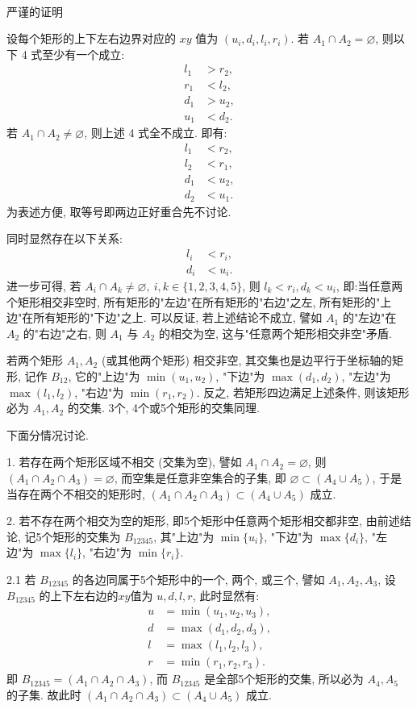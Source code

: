 ~ 

\noindent 严谨的证明

设每个矩形的上下左右边界对应的 $xy$ 值为 $(u_i, d_i, l_i, r_i)$. 若 $A_1 \cap A_2 = \varnothing$, 则以下 4 式至少有一个成立:
\begin{align*}
l_1 &> r_2, \\
r_1 &< l_2, \\
d_1 &> u_2, \\
u_1 &< d_2.
\end{align*}
若 $A_1\cap A_2 \neq \varnothing$, 则上述 4 式全不成立. 即有:
\begin{align*}
l_1 &< r_2, \\
l_2 &< r_1, \\
d_1 &< u_2, \\
d_2 &< u_1.
\end{align*}
为表述方便, 取等号即两边正好重合先不讨论.

同时显然存在以下关系:
\begin{align*}
l_i &< r_i, \\
d_i &< u_i.
\end{align*}
进一步可得, 若 $A_i\cap A_k\neq\varnothing,\ i,k\in\{1,2,3,4,5\}$, 则 $l_k < r_i, d_k < u_i$, 即:当任意两个矩形相交非空时, 所有矩形的"左边"在所有矩形的"右边"之左, 所有矩形的"上边"在所有矩形的"下边"之上.
可以反证, 若上述结论不成立, 譬如 $A_1$ 的"左边"在 $A_2$ 的"右边"之右, 则 $A_1$ 与 $A_2$ 的相交为空, 这与"任意两个矩形相交非空"矛盾.

若两个矩形 $A_1, A_2$ (或其他两个矩形) 相交非空, 其交集也是边平行于坐标轴的矩形, 记作 $B_{12}$, 它的"上边"为 $\min(u_1, u_2)$, "下边"为 $\max(d_1, d_2)$, "左边"为 $\max(l_1,l_2)$, "右边"为 $\min(r_1, r_2)$. 反之, 若矩形四边满足上述条件, 则该矩形必为 $A_1, A_2$ 的交集. 3个, 4个或5个矩形的交集同理.

下面分情况讨论.

1. 若存在两个矩形区域不相交 (交集为空), 譬如 $A_1\cap A_2=\varnothing$, 则 $(A_1\cap A_2\cap A_3)=\varnothing$, 而空集是任意非空集合的子集, 即 $ \varnothing\subset(A_4\cup A_5) $, 于是当存在两个不相交的矩形时, $(A_1\cap A_2\cap A_3) \subset (A_4\cup A_5)$ 成立. 


2. 若不存在两个相交为空的矩形, 即5个矩形中任意两个矩形相交都非空, 由前述结论, 记5个矩形的交集为 $B_{12345}$, 其"上边"为 $\min\{u_i\}$, "下边"为 $\max\{d_i\}$, "左边"为 $\max\{l_i\}$, "右边"为 $\min\{r_i\}$. 

2.1 若 $B_{12345}$ 的各边同属于5个矩形中的一个, 两个, 或三个, 譬如 $A_1, A_2, A_3$, 设 $B_{12345}$ 的上下左右边的$xy$值为 $u,d,l,r$, 此时显然有:
\begin{align*}
u &= \min(u_1, u_2, u_3), \\
d &= \max(d_1, d_2, d_3), \\
l &= \max(l_1, l_2, l_3), \\
r &= \min(r_1, r_2, r_3).
\end{align*}
即 $B_{12345} = (A_1\cap A_2\cap A_3)$, 而 $B_{12345}$ 是全部5个矩形的交集, 所以必为 $A_4, A_5$ 的子集. 故此时 $(A_1\cap A_2\cap A_3) \subset (A_4\cup A_5)$ 成立. 

